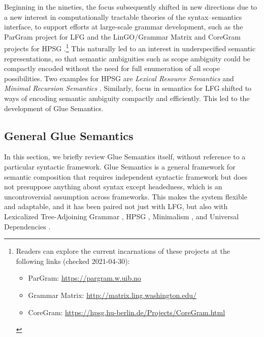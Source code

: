 Beginning in the nineties, the focus subsequently shifted in new directions due to a new interest in computationally tractable
theories of the syntax--semantics interface, to support efforts at
large-scale grammar development, such as the ParGram project for LFG
\citep{butt;ea99,butt;ea02-pargram} and the LinGO/Grammar Matrix and CoreGram projects for HPSG
\citep{flickinger00,bender;ea02,bender;ea10,MuellerCoreGram}.\footnote{Readers can
  explore the current incarnations of these projects at the following
links (checked 2021-04-30):
{
\begin{itemize}[leftmargin=2em]
\item ParGram: \url{https://pargram.w.uib.no}
\item Grammar Matrix: \url{http://matrix.ling.washington.edu/}
\item CoreGram: \url{https://hpsg.hu-berlin.de/Projects/CoreGram.html}
\end{itemize}}
\vspace{-\baselineskip}
} This naturally led to an
interest in underspecified semantic representations, so that semantic
ambiguities such as scope ambiguity could be compactly encoded without
the need for full enumeration of all scope possibilities. Two examples
for HPSG are \emph{Lexical Resource Semantics}\indexlrs \citep{richter04,penn;richter04}
and \emph{Minimal Recursion Semantics}\indexmrs
\citep{copestake;ea05}. Similarly, focus in semantics for LFG shifted
to ways of encoding semantic ambiguity compactly and efficiently. This
led to the development of Glue Semantics.



\subsection{General Glue Semantics}
\label{sec:glue-semantics}

In this section, we briefly review Glue Semantics itself, 
without reference to a particular
syntactic framework.  Glue Semantics is a general framework for
semantic composition that requires  independent syntactic
framework but does not presuppose anything about syntax except
headedness, which is an uncontroversial assumption across
frameworks. This makes the system flexible and adaptable, and it has
been paired not just with LFG, but also with Lexicalized
Tree-Adjoining Grammar \citep{frank;genabith01}, HPSG
\citep{asudeh;crouch01-hpsg-glue}, Minimalism \citep{Gotham2018}, and
Universal Dependencies \citep{gotham;haug18}.


